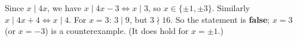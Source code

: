 Since $x\mid4x$, we have $x\mid4x-3\iff x\mid3$, so $x\in\{\pm1,\pm3\}$. Similarly $x\mid4x+4\iff x\mid4$. For $x=3$: $3\mid9$, but $3\nmid16$. So the statement is \textbf{false}; $\boxed{x=3}$ (or $x=-3$) is a counterexample. (It does hold for $x=\pm1$.)
